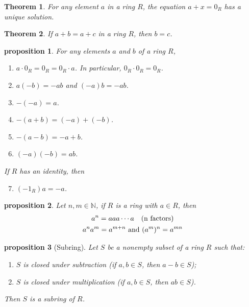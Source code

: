 \documentclass{article}
\newtheorem{theorem}{Theorem}[section]
\newtheorem{proposition}{Proposition}[section]
\newtheorem{proposition}{proposition}[section]
\theoremstyle{definition}
\theoremstyle{remark}
\begin{document}
\begin{theorem} \label{thm:uniqueness of additive inverse}
For any element $a$ in a ring $R$, the equation $a + x = 0_R$ has a unique solution.
\end{theorem}




\begin{theorem}\label{thm:subtraction}
If $a + b = a + c$ in a ring $R$, then $b = c$.
\end{theorem}




\begin{proposition} \label{prp:ring arithmetic with subtraction}
For any elements $a$ and $b$ of a ring $R$,
\begin{enumerate}
\item $a \cdot 0_R = 0_R = 0_R \cdot a$. In particular, $0_R \cdot 0_R = 0_R$.
\item $a(-b) = -ab$ \quad and \quad $(-a)b = -ab$.
\item $-(-a) = a$.
\item $-(a + b) = (-a) + (-b)$.
\item $-(a - b) = -a + b$.
\item $(-a)(-b) = ab$.
\end{enumerate}
If $R$ has an identity, then
\begin{enumerate}
\setcounter{enumi}{6}
\item $(-1_R)a = -a$.
\end{enumerate}
\end{proposition}






\begin{proposition}\label{ex:def of exponential}
Let $n,m \in \mathbb{N}$, if \(R\) is a ring with $a\in R$, then
\begin{gather*}
a^n = aaa\cdots a \quad (\textnormal{n factors})\\
a^na^m = a^{m+n} \textnormal{ and } (a^m)^n = a^{mn}
\end{gather*}


\end{proposition}






\begin{proposition}[Subring]\label{thm:check for subring_p2}
Let $S$ be a nonempty subset of a ring $R$ such that:
\begin{enumerate}
\item $S$ is closed under subtraction (if $a, b \in S$, then $a - b \in S$);
\item $S$ is closed under multiplication (if $a, b \in S$, then $ab \in S$).
\end{enumerate}
Then $S$ is a subring of $R$.
\end{proposition}
\end{document}
